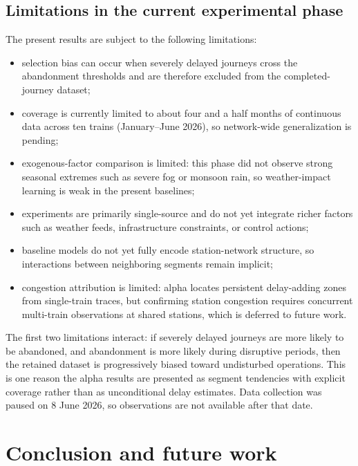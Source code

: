 \documentclass[a4paper,fleqn]{cas-dc}
\begin{document}
\subsection{Limitations in the current experimental phase}
The present results are subject to the following limitations:
\begin{itemize}
    \item selection bias can occur when severely delayed journeys cross the
          abandonment thresholds and are therefore excluded from the
          completed-journey dataset;
    \item coverage is currently limited to about four and a half months of
          continuous data across ten trains (January--June 2026), so
          network-wide generalization is pending;
    \item exogenous-factor comparison is limited: this phase did not observe
          strong seasonal extremes such as severe fog or monsoon rain, so
          weather-impact learning is weak in the present baselines;
    \item experiments are primarily single-source and do not yet integrate
          richer factors such as weather feeds, infrastructure constraints,
          or control actions;
    \item baseline models do not yet fully encode station-network structure,
          so interactions between neighboring segments remain implicit;
    \item congestion attribution is limited: alpha locates persistent
          delay-adding zones from single-train traces, but confirming
          station congestion requires concurrent multi-train observations
          at shared stations, which is deferred to future work.
\end{itemize}
The first two limitations interact: if severely delayed journeys are more
likely to be abandoned, and abandonment is more likely during disruptive
periods, then the retained dataset is progressively biased toward undisturbed
operations. This is one reason the alpha results are presented as segment
tendencies with explicit coverage rather than as unconditional delay
estimates. Data collection was paused on 8 June 2026, so observations are not available after that date.

\section{Conclusion and future work}
\label{sec:conclusion}
\end{document}
